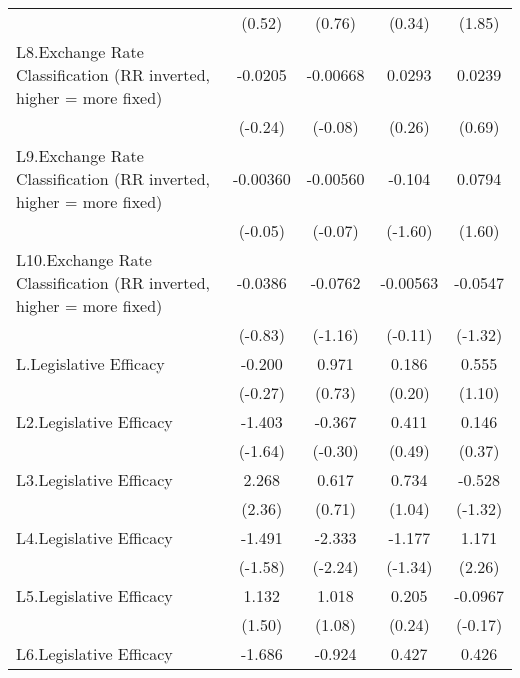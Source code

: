 {\begin{longtable}{l*{4}{c}}
                &   (0.52)         &   (0.76)         &   (0.34)         &   (1.85)         \\
[1em]
L8.Exchange Rate Classification (RR inverted, higher = more fixed)&  -0.0205         & -0.00668         &   0.0293         &   0.0239         \\
                &  (-0.24)         &  (-0.08)         &   (0.26)         &   (0.69)         \\
[1em]
L9.Exchange Rate Classification (RR inverted, higher = more fixed)& -0.00360         & -0.00560         &   -0.104         &   0.0794         \\
                &  (-0.05)         &  (-0.07)         &  (-1.60)         &   (1.60)         \\
[1em]
L10.Exchange Rate Classification (RR inverted, higher = more fixed)&  -0.0386         &  -0.0762         & -0.00563         &  -0.0547         \\
                &  (-0.83)         &  (-1.16)         &  (-0.11)         &  (-1.32)         \\
[1em]
L.Legislative Efficacy&   -0.200         &    0.971         &    0.186         &    0.555         \\
                &  (-0.27)         &   (0.73)         &   (0.20)         &   (1.10)         \\
[1em]
L2.Legislative Efficacy&   -1.403         &   -0.367         &    0.411         &    0.146         \\
                &  (-1.64)         &  (-0.30)         &   (0.49)         &   (0.37)         \\
[1em]
L3.Legislative Efficacy&    2.268\sym{*}  &    0.617         &    0.734         &   -0.528         \\
                &   (2.36)         &   (0.71)         &   (1.04)         &  (-1.32)         \\
[1em]
L4.Legislative Efficacy&   -1.491         &   -2.333\sym{*}  &   -1.177         &    1.171\sym{*}  \\
                &  (-1.58)         &  (-2.24)         &  (-1.34)         &   (2.26)         \\
[1em]
L5.Legislative Efficacy&    1.132         &    1.018         &    0.205         &  -0.0967         \\
                &   (1.50)         &   (1.08)         &   (0.24)         &  (-0.17)         \\
[1em]
L6.Legislative Efficacy&   -1.686         &   -0.924         &    0.427         &    0.426         \\

\end{longtable}}
